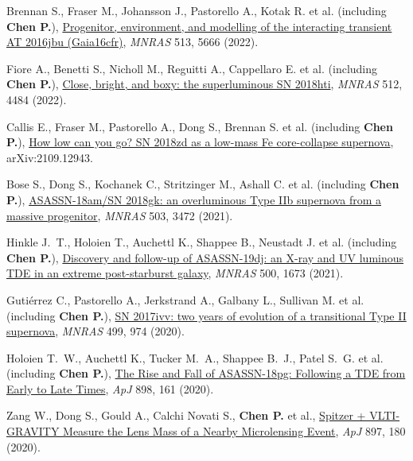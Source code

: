 \item Brennan S., Fraser M., Johansson J., Pastorello A., Kotak R. et al. (including \textbf{Chen P.}), \href{https://ui.adsabs.harvard.edu/abs/2022MNRAS.513.5666B}{Progenitor, environment, and modelling of the interacting transient AT 2016jbu (Gaia16cfr)}, \textit{MNRAS} 513, 5666 (2022).

\item Fiore A., Benetti S., Nicholl M., Reguitti A., Cappellaro E. et al. (including \textbf{Chen P.}), \href{https://ui.adsabs.harvard.edu/abs/2022MNRAS.512.4484F}{Close, bright, and boxy: the superluminous SN 2018hti}, \textit{MNRAS} 512, 4484 (2022).

\item Callis E., Fraser M., Pastorello A., Dong S., Brennan S. et al. (including \textbf{Chen P.}), \href{https://ui.adsabs.harvard.edu/abs/2021arXiv210912943C}{How low can you go? SN 2018zd as a low-mass Fe core-collapse supernova}, arXiv:2109.12943.

\item Bose S., Dong S., Kochanek C., Stritzinger M., Ashall C. et al. (including \textbf{Chen P.}), \href{https://ui.adsabs.harvard.edu/abs/2021MNRAS.503.3472B}{ASASSN-18am/SN 2018gk: an overluminous Type IIb supernova from a massive progenitor}, \textit{MNRAS} 503, 3472 (2021).

\item Hinkle J.~T., Holoien T., Auchettl K., Shappee B., Neustadt J. et al. (including \textbf{Chen P.}), \href{https://ui.adsabs.harvard.edu/abs/2021MNRAS.500.1673H}{Discovery and follow-up of ASASSN-19dj: an X-ray and UV luminous TDE in an extreme post-starburst galaxy}, \textit{MNRAS} 500, 1673 (2021).

\item Guti{\'e}rrez C., Pastorello A., Jerkstrand A., Galbany L., Sullivan M. et al. (including \textbf{Chen P.}), \href{https://ui.adsabs.harvard.edu/abs/2020MNRAS.499..974G}{SN 2017ivv: two years of evolution of a transitional Type II supernova}, \textit{MNRAS} 499, 974 (2020).

\item Holoien T.~W., Auchettl K., Tucker M.~A., Shappee B.~J., Patel S.~G. et al. (including \textbf{Chen P.}), \href{https://ui.adsabs.harvard.edu/abs/2020ApJ...898..161H}{The Rise and Fall of ASASSN-18pg: Following a TDE from Early to Late Times}, \textit{ApJ} 898, 161 (2020).

\item Zang W., Dong S., Gould A., Calchi Novati S., \textbf{Chen P.} et al., \href{https://ui.adsabs.harvard.edu/abs/2020ApJ...897..180Z}{Spitzer + VLTI-GRAVITY Measure the Lens Mass of a Nearby Microlensing Event}, \textit{ApJ} 897, 180 (2020).

